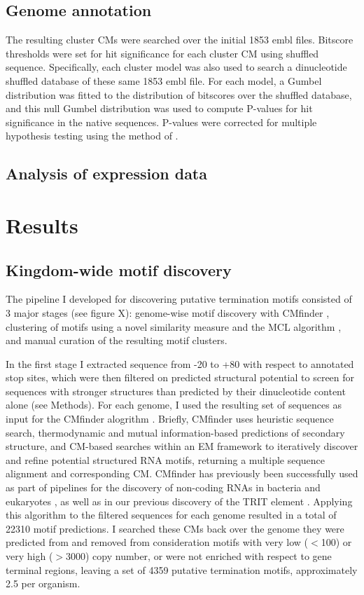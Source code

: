 \subsection{Genome annotation}

The resulting cluster CMs were searched over the initial 1853 embl files. Bitscore thresholds were set for hit significance for each cluster CM using shuffled sequence. Specifically, each cluster model was also used to search a dinucleotide shuffled database of these same 1853 embl file. For each model, a Gumbel distribution was fitted to the distribution of bitscores over the shuffled database, and this null Gumbel distribution was used to compute P-values for hit significance in the native sequences. P-values were corrected for multiple hypothesis testing using the method of \textcite{Benjamini1995}.

\subsection{Analysis of expression data}

\section{Results}

\subsection{Kingdom-wide motif discovery}

The pipeline I developed for discovering putative termination motifs consisted of 3 major stages (see figure X): genome-wise motif discovery with CMfinder  \parencite{Yao2006}, clustering of motifs using a novel similarity measure and the MCL algorithm \parencite{Enright2002}, and manual curation of the resulting motif clusters.  

In the first stage I extracted sequence from -20 to +80 with respect to annotated stop sites, which were then filtered on predicted structural potential to screen for sequences with stronger structures than predicted by their dinucleotide content alone (see Methods). For each genome, I used the resulting set of sequences as input for the CMfinder alogrithm \parencite{Yao2006}. Briefly, CMfinder uses heuristic sequence search, thermodynamic and mutual information-based predictions of secondary structure, and CM-based searches within an EM framework to iteratively discover and refine potential structured RNA motifs, returning a multiple sequence alignment and corresponding CM. CMfinder has previously been successfully used as part of pipelines for the discovery of non-coding RNAs in bacteria \parencite{Weinberg2007, Weinberg2010} and eukaryotes \parencite{Torarinsson2008a}, as well as in our previous discovery of the TRIT element \parencite{Gardner2011a}. Applying this algorithm to the filtered sequences for each genome resulted in a total of 22310 motif predictions. I searched these CMs back over the genome they were predicted from and removed from consideration motifs with very low ($<$100) or very high ($>3000$) copy number, or were not enriched with respect to gene terminal regions, leaving a set of 4359 putative termination motifs, approximately 2.5 per organism.

